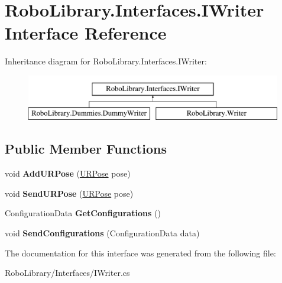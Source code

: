 \hypertarget{interface_robo_library_1_1_interfaces_1_1_i_writer}{}\section{Robo\+Library.\+Interfaces.\+I\+Writer Interface Reference}
\label{interface_robo_library_1_1_interfaces_1_1_i_writer}
Inheritance diagram for Robo\+Library.\+Interfaces.\+I\+Writer\+:\begin{figure}[H]
\begin{center}
\leavevmode
\includegraphics[height=2.000000cm]{interface_robo_library_1_1_interfaces_1_1_i_writer}
\end{center}
\end{figure}
\subsection*{Public Member Functions}
\begin{DoxyCompactItemize}
\item 
\hypertarget{interface_robo_library_1_1_interfaces_1_1_i_writer_a647fab03701336b9231713acd20965c9}{}\label{interface_robo_library_1_1_interfaces_1_1_i_writer_a647fab03701336b9231713acd20965c9} 
void {\bfseries Add\+U\+R\+Pose} (\hyperlink{class_robo_library_1_1_u_r_pose}{U\+R\+Pose} pose)
\item 
\hypertarget{interface_robo_library_1_1_interfaces_1_1_i_writer_a3e88f2733a35867096f26bf636128ed1}{}\label{interface_robo_library_1_1_interfaces_1_1_i_writer_a3e88f2733a35867096f26bf636128ed1} 
void {\bfseries Send\+U\+R\+Pose} (\hyperlink{class_robo_library_1_1_u_r_pose}{U\+R\+Pose} pose)
\item 
\hypertarget{interface_robo_library_1_1_interfaces_1_1_i_writer_a816de14714d3f21cfa3a9b477da24595}{}\label{interface_robo_library_1_1_interfaces_1_1_i_writer_a816de14714d3f21cfa3a9b477da24595} 
Configuration\+Data {\bfseries Get\+Configurations} ()
\item 
\hypertarget{interface_robo_library_1_1_interfaces_1_1_i_writer_adf42668550727c0e9d181925ceb6bc4e}{}\label{interface_robo_library_1_1_interfaces_1_1_i_writer_adf42668550727c0e9d181925ceb6bc4e} 
void {\bfseries Send\+Configurations} (Configuration\+Data data)
\end{DoxyCompactItemize}


The documentation for this interface was generated from the following file\+:\begin{DoxyCompactItemize}
\item 
Robo\+Library/\+Interfaces/I\+Writer.\+cs\end{DoxyCompactItemize}

